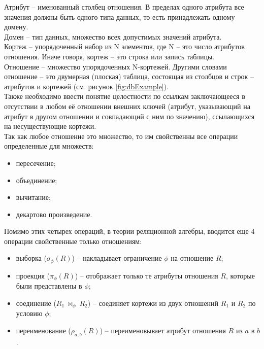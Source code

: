 \indent Атрибут -- именованный столбец отношения.
В пределах одного атрибута все значения должны быть одного типа данных, то есть принадлежать одному домену\cite{alice}.\\
\indent Домен -- тип данных, множество всех допустимых значений атрибута\cite{alice}.\\
\indent Кортеж -- упорядоченный набор из N элементов, где N -- это число атрибутов отношения\cite{alice}.
Иначе говоря, кортеж -- это строка или запись таблицы.\\
\indent Отношение -- множество упорядоченных N-кортежей\cite{alice}.
Другими словами отношение -- это двумерная (плоская) таблица, состоящая из столбцов и строк -- атрибутов и кортежей (см. рисунок \ref{fig:dbExample}).\\
\indent Также необходимо ввести понятие целостности по ссылкам заключающееся в отсутствии в любом её отношении внешних ключей (атрибут, указывающий на атрибут в другом отношении и совпадающий с ним по значению), ссылающихся на несуществующие кортежи.\\
\indent Так как любое отношение это множество, то им свойственны все операции определенные для множеств\cite{il}:
\begin{itemize}
	\item пересечение;
	\item объединение;
	\item вычитание;
	\item декартово произведение.
\end{itemize}
\indent Помимо этих четырех операций, в теории реляционной алгебры, вводится еще 4 операции свойственные только отношениям\cite{il}:
\begin{itemize}
	\item выборка ($\sigma_\phi(R)$) -- накладывает ограничение $\phi$ на отношение $R$;
	\item проекция ($\pi_\phi(R)$) -- отображает только те атрибуты отношения $R$, которые были представлены в $\phi$;
	\item соединение ($R_1\ \bowtie_\phi\ R_2$) -- соединяет кортежи из двух отношений $R_1$ и $R_2$ по условию $\phi$;
	\item переименование ($\rho_{a,b}(R)$) -- переименовывает атрибут отношения $R$ из $a$ в $b$ .
\end{itemize}
